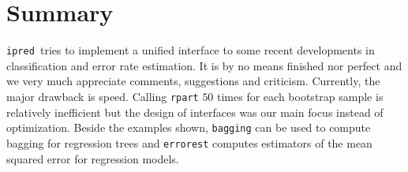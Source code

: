 \documentclass[11pt]{article}
\newcommand{\ipred}{\texttt{ipred }}
\begin{document}
\section{Summary}
\ipred tries to implement a unified interface to some recent developments
in classification and error rate estimation. It is by no means finished
nor perfect and we very much appreciate comments, suggestions and criticism.
Currently, the major drawback is speed. Calling \texttt{rpart} $50$ 
times for each bootstrap sample is relatively inefficient 
but the design of interfaces was our main focus instead of optimization.
Beside the examples shown, \texttt{bagging} can be used to compute bagging
for regression trees and \texttt{errorest} computes estimators of the 
mean squared error for regression models.



\end{document}
